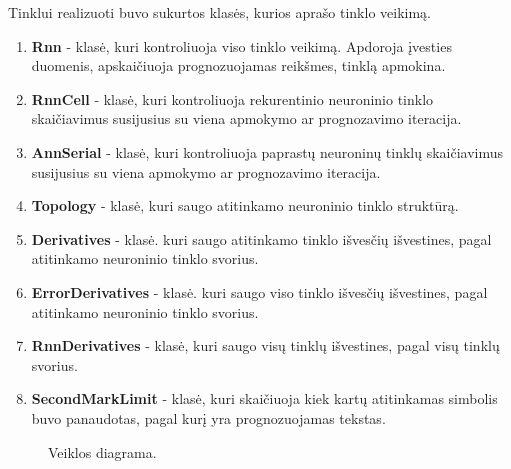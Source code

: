 \clearpage
Tinklui realizuoti buvo sukurtos klasės, kurios aprašo tinklo veikimą.

\begin{enumerate}
  \item \textbf{Rnn} - klasė, kuri kontroliuoja viso tinklo veikimą. Apdoroja įvesties duomenis, apskaičiuoja prognozuojamas reikšmes, tinklą apmokina.
  \item \textbf{RnnCell} - klasė, kuri kontroliuoja rekurentinio neuroninio tinklo skaičiavimus susijusius su viena apmokymo ar prognozavimo iteracija.
  \item \textbf{AnnSerial} - klasė, kuri kontroliuoja paprastų neuroninų tinklų skaičiavimus susijusius su viena apmokymo ar prognozavimo iteracija.
  \item \textbf{Topology} - klasė, kuri saugo atitinkamo neuroninio tinklo struktūrą.
  \item \textbf{Derivatives} - klasė. kuri saugo atitinkamo tinklo išvesčių išvestines, pagal atitinkamo neuroninio tinklo svorius.
  \item \textbf{ErrorDerivatives} - klasė. kuri saugo viso tinklo išvesčių išvestines, pagal atitinkamo neuroninio tinklo svorius.
  \item \textbf{RnnDerivatives} - klasė, kuri saugo visų tinklų išvestines, pagal visų tinklų svorius.
  \item \textbf{SecondMarkLimit} - klasė, kuri skaičiuoja kiek kartų atitinkamas simbolis buvo panaudotas, pagal kurį yra prognozuojamas tekstas.
\end{enumerate}

\clearpage

\begin{figure}[h!]
  \centering
{}
\caption{Veiklos diagrama.}
\label{fig:activity}
\end{figure}

